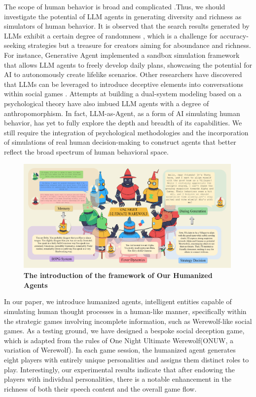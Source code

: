\documentclass[11pt]{article}
\begin{document}
The scope of human behavior is broad and complicated \citep{riedl2012interactive,yannakakis2012game}.Thus, we should investigate the potential of LLM agents in generating diversity and richness as simulators of human behavior. It is observed that the search results generated by LLMs exhibit a certain degree of randomness \citep{yadkori2024believe,hendrycks2020measuring}, which is a challenge for accuracy-seeking strategies but a treasure for creators aiming for aboundance and richness. For instance, Generative Agent \citep{park2023generative} implemented a sandbox simulation framework that allows LLM agents to freely develop daily plans, showcasing the potential for AI to autonomously create lifelike scenarios. Other researchers have discovered that LLMs can be leveraged to introduce deceptive elements into conversations within social games \citep{wang2023avalon}. Attempts at building a dual-system modeling based on a psychological theory \citep{wu2024enhance} have also imbued LLM agents with a degree of anthropomorphism. In fact, LLM-as-Agent, as a form of AI simulating human behavior, has yet to fully explore the depth and breadth of its capabilities. We still require the integration of psychological methodologies and the incorporation of simulations of real human decision-making to construct agents that better reflect the broad spectrum of human behavioral space.

\begin{figure}[ht]
  \centering
  \includegraphics[width=0.99\textwidth]{img/dialog.jpg}
  \caption{ \textbf{The introduction of the framework of Our Humanized Agents}  }
\label{fig:dialog}
    \vspace{-1em}
\end{figure}

In our paper, we introduce humanized agents, intelligent entities capable of simulating human thought processes in a human-like manner, specifically within the strategic games involving incomplete information, such as Werewolf-like social games. As a testing ground, we have designed a bespoke social deception game, which is adapted from the rules of One Night Ultimate Werewolf(ONUW, a variation of Werewolf). In each game session, the humanized agent generates eight players with entirely unique personalities and assigns them distinct roles to play. Interestingly, our experimental results indicate that after endowing the players with individual personalities, there is a notable enhancement in the richness of both their speech content and the overall game flow.
\end{document}
